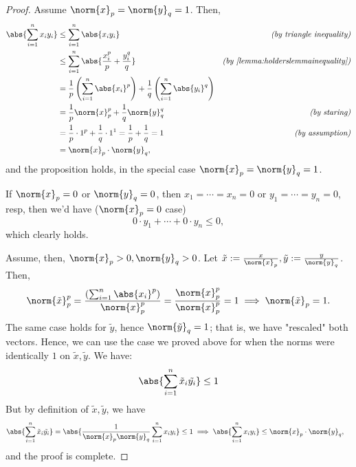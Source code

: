 \begin{proof}
    Assume $\norm{x}_p = \norm{y}_q = 1$. Then, \begin{align*}
        \abs{\sum_{i=1}^n x_i y_i} &\leq \sum_{i=1}^n\abs{x_i y_i} &\textit{(by triangle inequality)}\\
        &\leq \sum_{i=1}^{n} \abs{\frac{x_i^p}{p}  + \frac{y_i^q}{q}}  &\textit{(by \cref{lemma:holderslemmainequality})}\\
        &=  \frac{1}{p} \left(\sum_{i=1}^n \abs{x_i}^p\right) + \frac{1}{q}\left(\sum_{i=1}^n \abs{y_i}^q\right)&\\
        &= \frac{1}{p}\norm{x}_p^p + \frac{1}{q}\norm{y}_q^q & \textit{(by staring)}\\
        &= \frac{1}{p}\cdot 1^p + \frac{1}{q} \cdot 1^1 = \frac{1}{p} + \frac{1}{q} = 1 & \textit{(by assumption)}\\
        &= \norm{x}_p \cdot \norm{y}_q,
    \end{align*}
    and the proposition holds, in the special case $\norm{x}_p = \norm{y}_q = 1$.

    If $\norm{x}_p = 0$ or $\norm{y}_q = 0$, then $x_1 = \cdots = x_n = 0$ or $y_1 = \cdots = y_n = 0$, resp, then we'd have ($\norm{x}_p = 0$ case) \[
        0 \cdot y_1 + \cdots + 0\cdot y_n \leq 0, 
    \]
    which clearly holds.

    Assume, then, $\norm{x}_p > 0, \norm{y}_q > 0$. Let $\tilde{x} := \frac{x}{\norm{x}_p}, \tilde{y} := \frac{y}{\norm{y}_q}$. Then, \begin{align*}
        \norm{\tilde{x}}_p^p = \frac{\left(\sum_{i=1}^n \abs{x_i}^{p}\right)}{\norm{x}_p^p} = \frac{\norm{x}_p^p}{\norm{x}_p^p} = 1 \implies \norm{\tilde{x}}_p = 1.
    \end{align*}
    The same case holds for $\tilde{y}$, hence $\norm{\tilde{y}}_q = 1$; that is, we have "rescaled" both vectors. Hence, we can use the case we proved above for when the norms were identically $1$ on $\tilde{x}, \tilde{y}$. We have:
    \begin{align*}
        \abs{\sum_{i=1}^n \tilde{x}_i \tilde{y_i}} \leq 1
    \end{align*}
    But by definition of $\tilde{x}, \tilde{y}$, we have
    \begin{align*}
        \abs{\sum_{i=1}^n \tilde{x}_i \tilde{y_i}} &= \abs{\frac{1}{\norm{x}_p \norm{y}_q} \sum_{i=1}^n x_i y_i} \leq 1 \implies \abs{\sum_{i=1}^{n} x_i y_i} \leq \norm{x}_p \cdot \norm{y}_q,
    \end{align*}
    and the proof is complete.
\end{proof}

